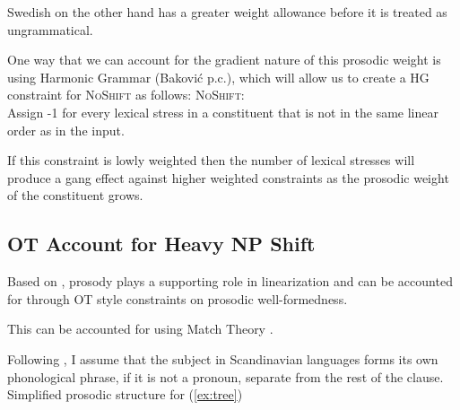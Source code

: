\documentclass[12pt, letterpaper]{article}
\begin{document}
\ex Swedish on the other hand has a greater weight allowance before it is treated as ungrammatical. 

\ex One way that we can account for the gradient nature of this prosodic weight is using Harmonic Grammar (Baković p.c.), which will allow us to create a HG constraint for \textsc{NoShift} as follows:
	\ea \textsc{NoShift}:\\
	Assign -1 for every lexical stress in a constituent that is not in the same linear order as in the input.
	\z 

\ex If this constraint is lowly weighted then the number of lexical stresses will produce a gang effect against higher weighted constraints as the prosodic weight of the constituent grows. 


\z 

\subsection{OT Account for Heavy NP Shift} \label{sec:HNPS}

\ea Based on \citet{anttilaRoleProsodyEnglish2010}, prosody plays a supporting role in linearization and can be accounted for through OT style constraints on prosodic well-formedness. 

\ex This can be accounted for using Match Theory \citep{selkirkClauseIntonationalPhrase2009,selkirkSyntaxPhonologyInterface2011}.

\ex Following \citet{myrbergSisterhoodProsodicBranching2013,myrbergProsodicWordSwedish2013,myrbergProsodicHierarchySwedish2015}, I assume that the subject in Scandinavian languages forms its own phonological phrase, if it is not a pronoun, separate from the rest of the clause. 
	\ea Simplified prosodic structure for (\ref{ex:tree})\\

	\z

\z 


\printbibliography[heading=bibintoc]
\end{document}
